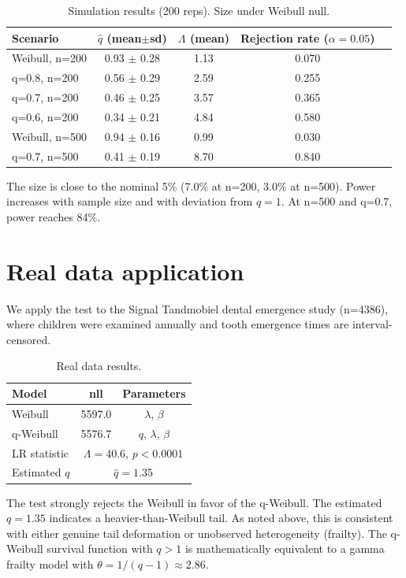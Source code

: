 \documentclass[11pt,a4paper]{article}
\begin{document}
\begin{table}[h]
\centering
\caption{Simulation results (200 reps). Size under Weibull null.}
\begin{tabular}{lcccc}
\hline
Scenario & $\hat{q}$ (mean$\pm$sd) & $\Lambda$ (mean) & Rejection rate ($\alpha=0.05$) \\
\hline
Weibull, n=200 & 0.93 $\pm$ 0.28 & 1.13 & 0.070 \\
q=0.8, n=200 & 0.56 $\pm$ 0.29 & 2.59 & 0.255 \\
q=0.7, n=200 & 0.46 $\pm$ 0.25 & 3.57 & 0.365 \\
q=0.6, n=200 & 0.34 $\pm$ 0.21 & 4.84 & 0.580 \\
Weibull, n=500 & 0.94 $\pm$ 0.16 & 0.99 & 0.030 \\
q=0.7, n=500 & 0.41 $\pm$ 0.19 & 8.70 & 0.840 \\
\hline
\end{tabular}
\end{table}

The size is close to the nominal 5\% (7.0\% at n=200, 3.0\% at n=500). Power increases with sample size and with deviation from $q=1$. At n=500 and q=0.7, power reaches 84\%.

\section{Real data application}

We apply the test to the Signal Tandmobiel dental emergence study (n=4386), where children were examined annually and tooth emergence times are interval-censored.

\begin{table}[h]
\centering
\caption{Real data results.}
\begin{tabular}{lcc}
\hline
Model & nll & Parameters \\
\hline
Weibull & 5597.0 & $\lambda$, $\beta$ \\
q-Weibull & 5576.7 & $q$, $\lambda$, $\beta$ \\
\hline
LR statistic & \multicolumn{2}{c}{$\Lambda = 40.6$, $p < 0.0001$} \\
Estimated $q$ & \multicolumn{2}{c}{$\hat{q} = 1.35$} \\
\hline
\end{tabular}
\end{table}

The test strongly rejects the Weibull in favor of the q-Weibull. The estimated $q=1.35$ indicates a heavier-than-Weibull tail. As noted above, this is consistent with either genuine tail deformation or unobserved heterogeneity (frailty). The q-Weibull survival function with $q>1$ is mathematically equivalent to a gamma frailty model with $\theta = 1/(q-1) \approx 2.86$.
\end{document}
